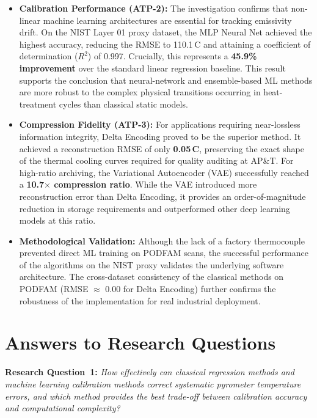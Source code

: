 \begin{itemize}[leftmargin=2em]
    \item \textbf{Calibration Performance (ATP-2):} The investigation confirms that non-linear machine learning architectures are essential for tracking emissivity drift. On the NIST Layer 01 proxy dataset, the MLP Neural Net achieved the highest accuracy, reducing the RMSE to 110.1\,\textdegree C and attaining a coefficient of determination ($R^2$) of 0.997. Crucially, this represents a \textbf{45.9\% improvement} over the standard linear regression baseline. This result supports the conclusion that neural-network and ensemble-based ML methods are more robust to the complex physical transitions occurring in heat-treatment cycles than classical static models.
    
    \item \textbf{Compression Fidelity (ATP-3):} For applications requiring near-lossless information integrity, Delta Encoding proved to be the superior method. It achieved a reconstruction RMSE of only \textbf{0.05\,\textdegree C}, preserving the exact shape of the thermal cooling curves required for quality auditing at AP\&T. For high-ratio archiving, the Variational Autoencoder (VAE) successfully reached a \textbf{10.7$\times$ compression ratio}. While the VAE introduced more reconstruction error than Delta Encoding, it provides an order-of-magnitude reduction in storage requirements and outperformed other deep learning models at this ratio.
    
    \item \textbf{Methodological Validation:} Although the lack of a factory thermocouple prevented direct ML training on PODFAM scans, the successful performance of the algorithms on the NIST proxy validates the underlying software architecture. The cross-dataset consistency of the classical methods on PODFAM (RMSE $\approx$ 0.00 for Delta Encoding) further confirms the robustness of the implementation for real industrial deployment.
\end{itemize}

\section{Answers to Research Questions}
\label{sec:rq-answers}

\textbf{Research Question~1:} \textit{How effectively can classical regression methods and machine learning calibration methods correct systematic pyrometer temperature errors, and which method provides the best trade-off between calibration accuracy and computational complexity?}

